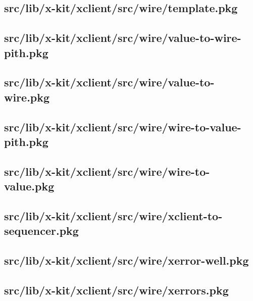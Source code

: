 \subsection{src/lib/x-kit/xclient/src/wire/template.pkg}


\subsection{src/lib/x-kit/xclient/src/wire/value-to-wire-pith.pkg}


\subsection{src/lib/x-kit/xclient/src/wire/value-to-wire.pkg}


\subsection{src/lib/x-kit/xclient/src/wire/wire-to-value-pith.pkg}


\subsection{src/lib/x-kit/xclient/src/wire/wire-to-value.pkg}


\subsection{src/lib/x-kit/xclient/src/wire/xclient-to-sequencer.pkg}


\subsection{src/lib/x-kit/xclient/src/wire/xerror-well.pkg}


\subsection{src/lib/x-kit/xclient/src/wire/xerrors.pkg}


